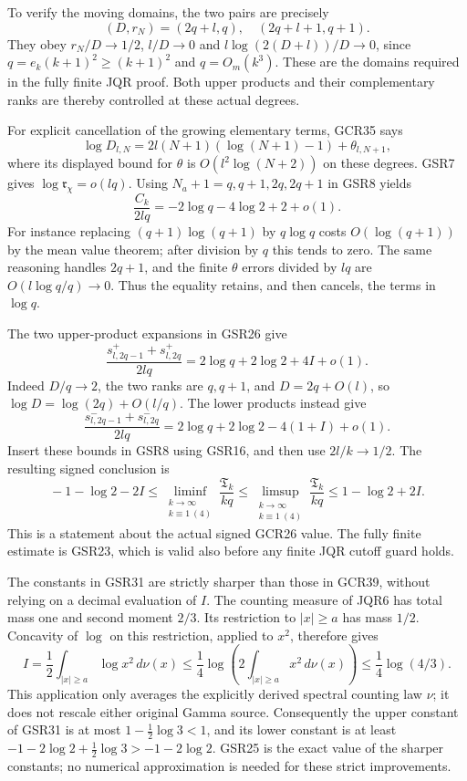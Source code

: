 To verify the moving domains, the two pairs are precisely
\[
 (D,r_N)=(2q+l,q),\quad(2q+l+1,q+1).
\tag{GSR27}
\]
They obey $r_N/D\to1/2$, $l/D\to0$ and
$l\log(2(D+l))/D\to0$, since
$q=e_k(k+1)^2\geq(k+1)^2$ and $q=O_m(k^3)$.
These are the domains required in the fully finite JQR
proof. Both upper products and their complementary ranks
are thereby controlled at these actual degrees.

For explicit cancellation of the growing elementary terms,
GCR35 says
\[
 \log D_{l,N}=2l(N+1)(\log(N+1)-1)+\theta_{l,N+1},
\]
where its displayed bound for $\theta$ is
$O(l^2\log(N+2))$ on these degrees. GSR7 gives
$\log\mathfrak r_\chi=o(lq)$.
Using $N_a+1=q,q+1,2q,2q+1$ in GSR8 yields
\[
 \frac{C_k}{2lq}
          =-2\log q-4\log2+2+o(1).
\tag{GSR28}
\]
For instance replacing $(q+1)\log(q+1)$ by $q\log q$
costs $O(\log(q+1))$ by the mean value theorem; after
division by $q$ this tends to zero. The same reasoning
handles $2q+1$, and the finite $\theta$ errors divided
by $lq$ are $O(l\log q/q)\to0$. Thus the equality
retains, and then cancels, the terms in $\log q$.

The two upper-product expansions in GSR26 give
\[
 \frac{s^+_{l,2q-1}+s^+_{l,2q}}{2lq}
             =2\log q+2\log2+4I+o(1).
\tag{GSR29}
\]
Indeed $D/q\to2$, the two ranks are $q,q+1$, and
$D=2q+O(l)$, so
$\log D=\log(2q)+O(l/q)$.
The lower products instead give
\[
 \frac{s^-_{l,2q-1}+s^-_{l,2q}}{2lq}
             =2\log q+2\log2-4(1+I)+o(1).
\tag{GSR30}
\]
Insert these bounds in GSR8 using GSR16, and then use
$2l/k\to1/2$. The resulting signed conclusion is
\[
 \boxed{\quad
 -1-\log2-2I
 \leq\liminf_{\substack{k\to\infty\\k\equiv1\ (4)}}
                    \frac{\mathfrak T_k}{kq}
 \leq\limsup_{\substack{k\to\infty\\k\equiv1\ (4)}}
                    \frac{\mathfrak T_k}{kq}
 \leq1-\log2+2I.
 \quad}\tag{GSR31}
\]
This is a statement about the actual signed GCR26 value.
The fully finite estimate is GSR23, which is valid also
before any finite JQR cutoff guard holds.

The constants in GSR31 are strictly sharper than those
in GCR39, without relying on a decimal evaluation of $I$.
The counting measure of JQR6 has total mass one and second
moment $2/3$. Its restriction to $|x|\geq a$ has mass $1/2$.
Concavity of $\log$ on this restriction, applied to $x^2$,
therefore gives
\[
 I=\frac12\int_{|x|\geq a}\log x^2\,d\nu(x)
 \leq\frac14\log\left(2\int_{|x|\geq a}x^2\,d\nu(x)\right)
 \leq\frac14\log(4/3).
\tag{GSR32}
\]
This application only averages the explicitly derived spectral
counting law $\nu$; it does not rescale either original Gamma source.
Consequently the upper constant of GSR31 is at most
$1-\tfrac12\log3<1$, and its lower constant is at least
$-1-2\log2+\tfrac12\log3>-1-2\log2$.
GSR25 is the exact value of the sharper constants; no
numerical approximation is needed for these strict improvements.

